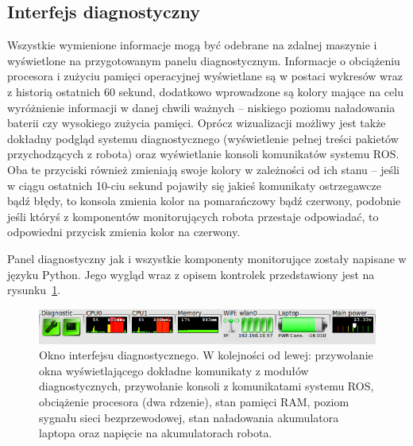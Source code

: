 \subsection{Interfejs diagnostyczny}

Wszystkie wymienione informacje mogą być odebrane na zdalnej maszynie i
wyświetlone na przygotowanym panelu diagnostycznym. Informacje o obciążeniu
procesora i zużyciu pamięci operacyjnej wyświetlane są w postaci wykresów
wraz z historią ostatnich 60 sekund, dodatkowo wprowadzone są kolory mające
na celu wyróżnienie informacji w danej chwili ważnych -- niskiego poziomu
naładowania baterii czy wysokiego zużycia pamięci. Oprócz wizualizacji
możliwy jest także dokładny podgląd systemu diagnostycznego (wyświetlenie
pełnej treści pakietów przychodzących z robota) oraz wyświetlanie konsoli
komunikatów systemu ROS. Oba te przyciski również zmieniają swoje kolory 
w zależności od ich stanu -- jeśli w ciągu ostatnich 10-ciu sekund pojawiły
się jakieś komunikaty ostrzegawcze bądź błędy, to konsola zmienia kolor na
pomarańczowy bądź czerwony, podobnie jeśli któryś z komponentów monitorujących
robota przestaje odpowiadać, to odpowiedni przycisk zmienia kolor na czerwony.

Panel diagnostyczny jak i wszystkie komponenty monitorujące zostały napisane w
języku Python. Jego wygląd wraz z opisem kontrolek przedstawiony jest na
rysunku~\ref{fig:elektron_dashboard}.

\begin{figure}[htb!]
\centering
\includegraphics[width=13cm]{../../Common/img/ros/elektron_dashboard}
\caption[Okno interfejsu diagnostycznego]{Okno interfejsu diagnostycznego. W
kolejności od lewej: przywołanie okna wyświetlającego dokładne komunikaty z modułów diagnostycznych, przywołanie
konsoli z komunikatami systemu ROS, obciążenie procesora (dwa rdzenie), stan
pamięci RAM, poziom sygnału sieci bezprzewodowej, stan naładowania akumulatora
laptopa oraz napięcie na akumulatorach robota.}
\label{fig:elektron_dashboard}
\end{figure}
